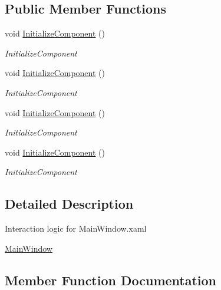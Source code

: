 \subsection*{Public Member Functions}
\begin{DoxyCompactItemize}
\item 
void \hyperlink{class_s_e_server_g_u_i_1_1_main_window_a6230c34be35833edd6bb676e09113a8f}{Initialize\+Component} ()
\begin{DoxyCompactList}\small\item\em Initialize\+Component \end{DoxyCompactList}\item 
void \hyperlink{class_s_e_server_g_u_i_1_1_main_window_a6230c34be35833edd6bb676e09113a8f}{Initialize\+Component} ()
\begin{DoxyCompactList}\small\item\em Initialize\+Component \end{DoxyCompactList}\item 
void \hyperlink{class_s_e_server_g_u_i_1_1_main_window_a6230c34be35833edd6bb676e09113a8f}{Initialize\+Component} ()
\begin{DoxyCompactList}\small\item\em Initialize\+Component \end{DoxyCompactList}\item 
void \hyperlink{class_s_e_server_g_u_i_1_1_main_window_a6230c34be35833edd6bb676e09113a8f}{Initialize\+Component} ()
\begin{DoxyCompactList}\small\item\em Initialize\+Component \end{DoxyCompactList}\end{DoxyCompactItemize}


\subsection{Detailed Description}
Interaction logic for Main\+Window.\+xaml 

\hyperlink{class_s_e_server_g_u_i_1_1_main_window}{Main\+Window} 

\subsection{Member Function Documentation}
\hypertarget{class_s_e_server_g_u_i_1_1_main_window_a6230c34be35833edd6bb676e09113a8f}{}
